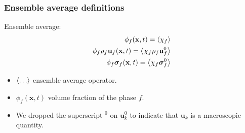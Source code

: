 \documentclass{sintefbeamer}
\begin{document}
\begin{frame}
  \frametitle{Ensemble average definitions}
Ensemble average: 
\begin{align*}
  \phi_f (\textbf{x},t) = \left<\chi_f \right>\\
  \phi_f \rho_f  \textbf{u}_f (\textbf{x},t) = \left<\chi_f \rho_f \textbf{u}_f^0 \right>\\
  \phi_f \bm\sigma_f (\textbf{x},t) = \left<\chi_f \bm\sigma_f^0 \right>\\
  \label{eq:1_avg}
\end{align*}


\begin{definition}
  \begin{itemize}
    \item $\left<\ldots\right>$ ensemble average operator. 
    \item  $\phi_f (\textbf{x},t)$ volume fraction of the phase $f$. 
    \item We dropped the superscript $^0$ on $\textbf{u}^0_k$ to indicate that $\textbf{u}_k$ is a macroscopic quantity. 
  \end{itemize}
\end{definition}
\end{frame}
\end{document}
